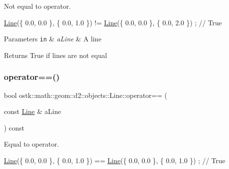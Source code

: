 Not equal to operator. 


\begin{DoxyCode}
\hyperlink{classostk_1_1math_1_1geom_1_1d2_1_1objects_1_1_line_aa1570ebec4d4f57cbed3c188e6b65613}{Line}(\{ 0.0, 0.0 \}, \{ 0.0, 1.0 \}) != \hyperlink{classostk_1_1math_1_1geom_1_1d2_1_1objects_1_1_line_aa1570ebec4d4f57cbed3c188e6b65613}{Line}(\{ 0.0, 0.0 \}, \{ 0.0, 2.0 \}) ; \textcolor{comment}{// True}
\end{DoxyCode}



\begin{DoxyParams}[1]{Parameters}
\mbox{\tt in}  & {\em a\+Line} & A line \\
\hline
\end{DoxyParams}
\begin{DoxyReturn}{Returns}
True if lines are not equal 
\end{DoxyReturn}
\mbox{\label{classostk_1_1math_1_1geom_1_1d2_1_1objects_1_1_line_a28431140a19916f4bd81c991b6db0966}} 
\subsubsection{\texorpdfstring{operator==()}{operator==()}}
{\footnotesize\ttfamily bool ostk\+::math\+::geom\+::d2\+::objects\+::\+Line\+::operator== (\begin{DoxyParamCaption}\item[{const \hyperlink{classostk_1_1math_1_1geom_1_1d2_1_1objects_1_1_line}{Line} \&}]{a\+Line }\end{DoxyParamCaption}) const}



Equal to operator. 


\begin{DoxyCode}
\hyperlink{classostk_1_1math_1_1geom_1_1d2_1_1objects_1_1_line_aa1570ebec4d4f57cbed3c188e6b65613}{Line}(\{ 0.0, 0.0 \}, \{ 0.0, 1.0 \}) == \hyperlink{classostk_1_1math_1_1geom_1_1d2_1_1objects_1_1_line_aa1570ebec4d4f57cbed3c188e6b65613}{Line}(\{ 0.0, 0.0 \}, \{ 0.0, 1.0 \}) ; \textcolor{comment}{// True}
\end{DoxyCode}



